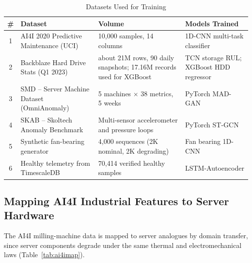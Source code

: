 \documentclass[12pt,a4paper]{report}
\begin{document}
\begin{table}[h!]
  \centering
  \caption{Datasets Used for Training}
  \label{tab:datasets}
  \vspace*{5pt}
  \footnotesize
  \renewcommand{\arraystretch}{1.4}
  \begin{tabular}{|c|p{3.2cm}|p{3.8cm}|p{4.2cm}|}
    \hline
    \textbf{\#} & \textbf{Dataset} & \textbf{Volume} & \textbf{Models Trained} \\ \hline
    1 & AI4I 2020 Predictive Maintenance (UCI) & 10,000 samples, 14 columns & 1D-CNN multi-task classifier \\ \hline
    2 & Backblaze Hard Drive Stats (Q1 2023) & about 21M rows, 90 daily snapshots; 17.16M records used for XGBoost & TCN storage RUL; XGBoost HDD regressor \\ \hline
    3 & SMD -- Server Machine Dataset (OmniAnomaly) & 5 machines $\times$ 38 metrics, 5 weeks & PyTorch MAD-GAN \\ \hline
    4 & SKAB -- Skoltech Anomaly Benchmark & Multi-sensor accelerometer and pressure loops & PyTorch ST-GCN \\ \hline
    5 & Synthetic fan-bearing generator & 4,000 sequences (2K nominal, 2K degrading) & Fan bearing 1D-CNN \\ \hline
    6 & Healthy telemetry from TimescaleDB & 70,414 verified healthy samples & LSTM-Autoencoder \\ \hline
  \end{tabular}
\end{table}

\subsection{Mapping AI4I Industrial Features to Server Hardware}
The AI4I milling-machine data is mapped to server analogues by domain transfer, since server components degrade under the same thermal and electromechanical laws (Table~\ref{tab:ai4imap}).
\end{document}
